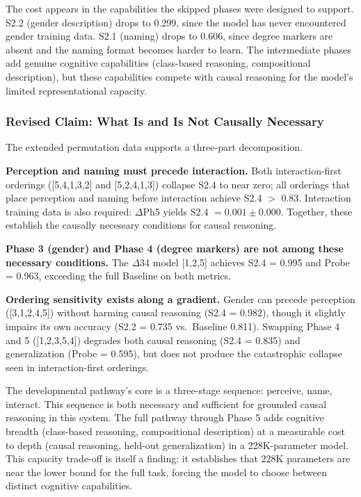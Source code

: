 \documentclass{article}
\begin{document}
The cost appears in the capabilities the skipped phases were designed to support. S2.2 (gender description) drops to 0.299, since the model has never encountered gender training data. S2.1 (naming) drops to 0.606, since degree markers are absent and the naming format becomes harder to learn. The intermediate phases add genuine cognitive capabilities (class-based reasoning, compositional description), but these capabilities compete with causal reasoning for the model's limited representational capacity.

\subsubsection{Revised Claim: What Is and Is Not Causally Necessary}

The extended permutation data supports a three-part decomposition.

\textbf{Perception and naming must precede interaction.} Both interaction-first orderings ([5,4,1,3,2] and [5,2,4,1,3]) collapse S2.4 to near zero; all orderings that place perception and naming before interaction achieve S2.4 $>$ 0.83. Interaction training data is also required: $\Delta$Ph5 yields S2.4 $= 0.001 \pm 0.000$. Together, these establish the causally necessary conditions for causal reasoning.

\textbf{Phase 3 (gender) and Phase 4 (degree markers) are not among these necessary conditions.} The $\Delta$34 model [1,2,5] achieves S2.4 = 0.995 and Probe = 0.963, exceeding the full Baseline on both metrics.

\textbf{Ordering sensitivity exists along a gradient.} Gender can precede perception ([3,1,2,4,5]) without harming causal reasoning (S2.4 = 0.982), though it slightly impairs its own accuracy (S2.2 = 0.735 vs.\ Baseline 0.811). Swapping Phase 4 and 5 ([1,2,3,5,4]) degrades both causal reasoning (S2.4 = 0.835) and generalization (Probe = 0.595), but does not produce the catastrophic collapse seen in interaction-first orderings.

The developmental pathway's core is a three-stage sequence: perceive, name, interact. This sequence is both necessary and sufficient for grounded causal reasoning in this system. The full pathway through Phase 5 adds cognitive breadth (class-based reasoning, compositional description) at a measurable cost to depth (causal reasoning, held-out generalization) in a 228K-parameter model. This capacity trade-off is itself a finding: it establishes that 228K parameters are near the lower bound for the full task, forcing the model to choose between distinct cognitive capabilities.
\end{document}
